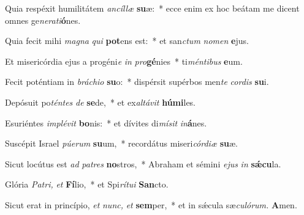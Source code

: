 \item Quia respéxit humilitátem \textit{ancíllæ} \textbf{su}æ:~* ecce enim ex hoc beátam me dicent omnes ge\textit{nerati}\textbf{ó}nes.
\item Quia fecit mihi \textit{magna} \textit{qui} \textbf{pot}ens est:~* et san\textit{ctum} \textit{nomen} \textbf{e}jus.
\item Et misericórdia ejus a progéni\textit{e} \textit{in} \textit{pro}\textbf{gé}nies~* ti\textit{méntibus} \textbf{e}um.
\item Fecit poténtiam in \textit{bráchio} \textbf{su}o:~* dispérsit supérbos men\textit{te} \textit{cordis} \textbf{su}i.
\item Depósuit po\textit{téntes} \textit{de} \textbf{se}de,~* et ex\tinyhspace\textit{altávit} \textbf{hú}\textbf{mi}les.
\item Esuriéntes \textit{implévit} \textbf{bo}nis:~* et dívites di\textit{mísit} \textit{in}\textbf{á}nes.
\item Suscépit Israel \textit{púerum} \textbf{su}um,~* recordátus miseri\hspace*{0.01em}\textit{córdiæ} \textbf{su}æ.
\item Sicut locútus est \textit{ad} \textit{patres} \textbf{no}stros,~* Abraham et sémini \textit{ejus} \textit{in} \textbf{sǽcu}la.
\item Glória \textit{Patri,} \textit{et} \textbf{Fí}lio,~* et Spi\textit{rítui} \textbf{San}cto.
\item Sicut erat in princípio, \textit{et} \textit{nunc,} \textit{et} \textbf{sem}per,~* et in sǽcula sæ\hspace*{0.01em}\textit{culórum.} \textbf{A}men.